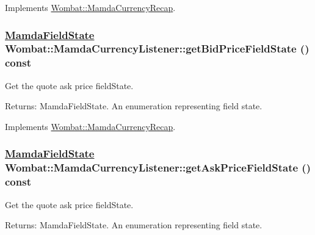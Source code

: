Implements \hyperlink{classWombat_1_1MamdaCurrencyRecap_7f59a08ae952cfc742c9530d343784b7}{Wombat::Mamda\-Currency\-Recap}.\hypertarget{classWombat_1_1MamdaCurrencyListener_5db8b40b06fe6b4fb3fa1e388502a8c2}{
\subsubsection[getBidPriceFieldState]{\setlength{\rightskip}{0pt plus 5cm}\hyperlink{namespaceWombat_93aac974f2ab713554fd12a1fa3b7d2a}{Mamda\-Field\-State} Wombat::Mamda\-Currency\-Listener::get\-Bid\-Price\-Field\-State () const}}
\label{classWombat_1_1MamdaCurrencyListener_5db8b40b06fe6b4fb3fa1e388502a8c2}


Get the quote ask price field\-State. 

\begin{Desc}
\item[Returns:]Mamda\-Field\-State. An enumeration representing field state. \end{Desc}


Implements \hyperlink{classWombat_1_1MamdaCurrencyRecap_402c9cbe8f4b3a19f0cd579cb5871b5b}{Wombat::Mamda\-Currency\-Recap}.\hypertarget{classWombat_1_1MamdaCurrencyListener_485502d95a2b9f71119353b736719d57}{
\subsubsection[getAskPriceFieldState]{\setlength{\rightskip}{0pt plus 5cm}\hyperlink{namespaceWombat_93aac974f2ab713554fd12a1fa3b7d2a}{Mamda\-Field\-State} Wombat::Mamda\-Currency\-Listener::get\-Ask\-Price\-Field\-State () const}}
\label{classWombat_1_1MamdaCurrencyListener_485502d95a2b9f71119353b736719d57}


Get the quote ask price field\-State. 

\begin{Desc}
\item[Returns:]Mamda\-Field\-State. An enumeration representing field state. \end{Desc}


